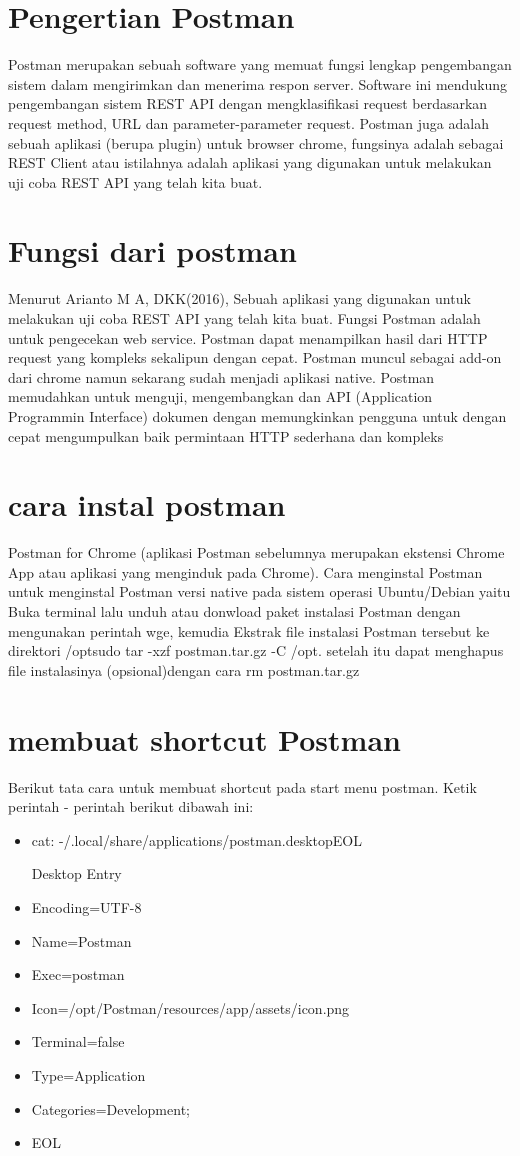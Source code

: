 
\section{Pengertian Postman}
Postman merupakan sebuah software yang memuat fungsi lengkap pengembangan sistem dalam mengirimkan dan menerima respon server. Software ini mendukung pengembangan sistem REST API dengan mengklasifikasi request berdasarkan request method, URL dan parameter-parameter request. Postman juga adalah sebuah aplikasi (berupa plugin) untuk browser chrome, fungsinya adalah sebagai REST Client atau istilahnya adalah aplikasi yang digunakan untuk melakukan uji coba REST API yang telah kita buat.

\section{Fungsi dari postman}
Menurut Arianto M A, DKK(2016), Sebuah aplikasi yang digunakan untuk melakukan uji coba REST API yang telah kita buat. Fungsi Postman adalah untuk pengecekan web service. Postman dapat menampilkan hasil dari HTTP request yang kompleks sekalipun dengan cepat. Postman muncul sebagai add-on dari chrome namun sekarang sudah menjadi aplikasi native. Postman memudahkan untuk menguji, mengembangkan dan API (Application Programmin Interface) dokumen dengan memungkinkan pengguna untuk dengan cepat mengumpulkan baik permintaan HTTP sederhana dan kompleks

\section{cara instal postman}
Postman for Chrome (aplikasi Postman sebelumnya merupakan ekstensi Chrome App atau aplikasi yang menginduk pada Chrome).
Cara menginstal Postman untuk menginstal Postman versi native pada sistem operasi Ubuntu/Debian yaitu 
Buka terminal lalu unduh atau donwload paket instalasi Postman dengan mengunakan perintah wge,
kemudia Ekstrak file instalasi Postman tersebut ke direktori /optsudo tar -xzf postman.tar.gz -C /opt.
setelah itu dapat menghapus file instalasinya (opsional)dengan cara rm postman.tar.gz


\section{membuat shortcut Postman}
Berikut tata cara untuk membuat shortcut pada start menu postman.  Ketik perintah - perintah berikut dibawah ini:
\begin{itemize}
\item cat: -/.local/share/applications/postman.desktopEOL
\item [Desktop Entry]
\item Encoding=UTF-8
\item Name=Postman
\item Exec=postman
\item Icon=/opt/Postman/resources/app/assets/icon.png
\item Terminal=false
\item Type=Application
\item Categories=Development;
 \item EOL
\end{itemize}


